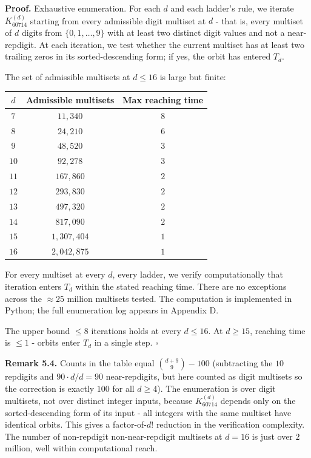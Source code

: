 \documentclass[11pt,letterpaper]{article}
\theoremstyle{paperstyle}
\theoremstyle{paperstyledef}
\theoremstyle{paperstylerem}
\begin{document}
\textbf{Proof.} Exhaustive enumeration. For each \(d\) and each ladder's
rule, we iterate \(K_{60714}^{(d)}\) starting from every admissible
digit multiset at \(d\) - that is, every multiset of \(d\) digits from
\(\{0, 1, \ldots, 9\}\) with at least two distinct digit values and not
a near-repdigit. At each iteration, we test whether the current multiset
has at least two trailing zeros in its sorted-descending form; if yes,
the orbit has entered \(T_d\).

The set of admissible multisets at \(d \leq 16\) is large but finite:

\begin{longtable}[]{@{}ccc@{}}
\toprule\noalign{}
\(d\) & Admissible multisets & Max reaching time \\
\midrule\noalign{}
\endhead
\bottomrule\noalign{}
\endlastfoot
\(7\) & \(11{,}340\) & \(8\) \\
\(8\) & \(24{,}210\) & \(6\) \\
\(9\) & \(48{,}520\) & \(3\) \\
\(10\) & \(92{,}278\) & \(3\) \\
\(11\) & \(167{,}860\) & \(2\) \\
\(12\) & \(293{,}830\) & \(2\) \\
\(13\) & \(497{,}320\) & \(2\) \\
\(14\) & \(817{,}090\) & \(2\) \\
\(15\) & \(1{,}307{,}404\) & \(1\) \\
\(16\) & \(2{,}042{,}875\) & \(1\) \\
\end{longtable}

For every multiset at every \(d\), every ladder, we verify
computationally that iteration enters \(T_d\) within the stated reaching
time. There are no exceptions across the \(\approx 25\) million
multisets tested. The computation is implemented in Python; the full
enumeration log appears in Appendix D.

The upper bound \(\leq 8\) iterations holds at every \(d \leq 16\). At
\(d \geq 15\), reaching time is \(\leq 1\) - orbits enter \(T_d\) in a
single step. \(\square\)

\textbf{Remark 5.4.} Counts in the table equal \(\binom{d+9}{9} - 100\)
(subtracting the \(10\) repdigits and \(90 \cdot d / d = 90\)
near-repdigits, but here counted as digit multisets so the correction is
exactly \(100\) for all \(d \geq 4\)). The enumeration is over digit
multisets, not over distinct integer inputs, because \(K_{60714}^{(d)}\)
depends only on the sorted-descending form of its input - all integers
with the same multiset have identical orbits. This gives a
factor-of-\(d!\) reduction in the verification complexity. The number of
non-repdigit non-near-repdigit multisets at \(d = 16\) is just over
\(2\) million, well within computational reach.
\end{document}
